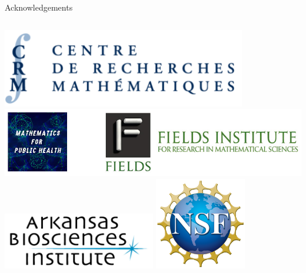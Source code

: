 \documentclass[
  ignorenonframetext,
]{beamer}
\newif\ifbibliography
\begin{document}
\begin{frame}{Acknowledgements}
\begin{columns}[T]
\begin{column}{0.5\textwidth}
\includegraphics[width=0.8\textwidth,height=\textheight]{img/crm_logo.png}
\includegraphics[width=1\textwidth,height=\textheight]{img/Fields_MfPH.jpg}
\includegraphics[width=0.5\textwidth,height=\textheight]{img/ABI.png}
\includegraphics[width=0.3\textwidth,height=\textheight]{img/nsf.png}
\end{column}
\end{columns}
\end{frame}


\begin{frame}[allowframebreaks]{}
  \bibliographytrue
  \printbibliography[heading=none]
\end{frame}
\end{document}
